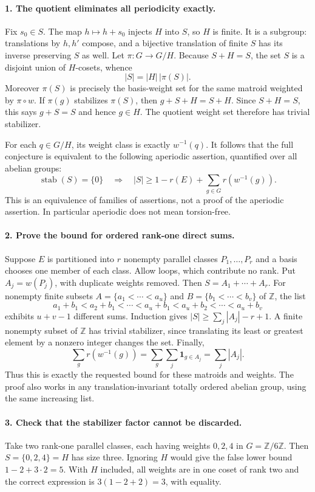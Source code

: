 \documentclass[11pt,a4paper]{article}
\begin{document}
\paragraph{1. The quotient eliminates all periodicity exactly.}
Fix $s_0\in S$. The map $h\mapsto h+s_0$ injects $H$ into $S$,
so $H$ is finite. It is a subgroup: translations by $h,h'$ compose,
and a bijective translation of finite $S$ has its inverse preserving
$S$ as well. Let $\pi:G\to G/H$. Because $S+H=S$, the set $S$
is a disjoint union of $H$-cosets, whence
\[
 |S|=|H|\,|\pi(S)|.
\]
Moreover $\pi(S)$ is precisely the basis-weight set for the same
matroid weighted by $\pi\circ w$. If $\pi(g)$ stabilizes $\pi(S)$,
then $g+S+H=S+H$. Since $S+H=S$, this says $g+S=S$ and hence
$g\in H$. The quotient weight set therefore has trivial stabilizer.

For each $q\in G/H$, its weight class is exactly $w^{-1}(q)$.
It follows that the full conjecture is equivalent to the following
aperiodic assertion, quantified over all abelian groups:
\[
 \operatorname{stab}(S)=\{0\}\quad\Longrightarrow\quad
 |S|\ge1-r(E)+\sum_{g\in G}r(w^{-1}(g)).
\]
This is an equivalence of families of assertions, not a proof of the
aperiodic assertion. In particular aperiodic does not mean torsion-free.

\paragraph{2. Prove the bound for ordered rank-one direct sums.}
Suppose $E$ is partitioned into $r$ nonempty parallel classes
$P_1,\ldots,P_r$ and a basis chooses one member of each class.
Allow loops, which contribute no rank. Put $A_j=w(P_j)$, with
duplicate weights removed. Then $S=A_1+\cdots+A_r$.
For nonempty finite subsets $A=\{a_1<\cdots<a_u\}$ and
$B=\{b_1<\cdots<b_v\}$ of $\mathbb Z$, the list
\[
 a_1+b_1<a_2+b_1<\cdots<a_u+b_1
 <a_u+b_2<\cdots<a_u+b_v
\]
exhibits $u+v-1$ different sums. Induction gives
$|S|\ge\sum_j|A_j|-r+1$. A finite nonempty subset of $\mathbb Z$
has trivial stabilizer, since translating its least or greatest element
by a nonzero integer changes the set. Finally,
\[
 \sum_g r(w^{-1}(g))
 =\sum_g\sum_j\boldsymbol 1_{g\in A_j}
 =\sum_j|A_j|.
\]
Thus this is exactly the requested bound for these matroids and weights.
The proof also works in any translation-invariant totally ordered abelian
group, using the same increasing list.

\paragraph{3. Check that the stabilizer factor cannot be discarded.}
Take two rank-one parallel classes, each having weights $0,2,4$ in
$G=\mathbb Z/6\mathbb Z$. Then $S=\{0,2,4\}=H$ has size three.
Ignoring $H$ would give the false lower bound $1-2+3\cdot2=5$.
With $H$ included, all weights are in one coset of rank two and the
correct expression is $3(1-2+2)=3$, with equality.
\end{document}
